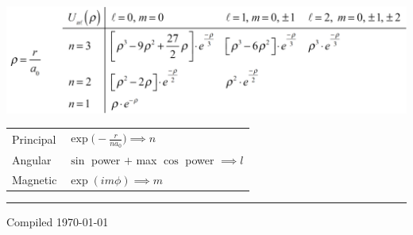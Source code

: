 \documentclass[10pt]{article}
\begin{document}
\begin{multicols*}{3}
\includegraphics[width=\linewidth]{images/hydrogen_radial_wavefunction.png}

{\renewcommand{\arraystretch}{1.4}
\begin{tabular}{@{}ll}
    Principal & $\exp\bigl(-\frac{r}{na_0}\bigr)\implies n$ \\
    Angular & $\sin$ power $+$ max $\cos$ power $\implies l$ \\
    Magnetic & $\exp(im\phi)\implies m$
\end{tabular}}

\rule{\linewidth}{0.1pt}

\scriptsize 
Compiled \today

\end{multicols*}
\end{document}
